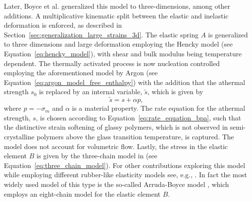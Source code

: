 Later, Boyce et al. \citep{boyceLargeInelasticDeformation1988} generalized this model to three-dimensions, among other additions.
A multiplicative kinematic split between the elastic and inelastic deformation is enforced, as described in Section~\ref{sec:generalization_large_strains_3d}.
The elastic spring $A$ is generalized to three dimensions and large deformation employing the Hencky model (see Equation~\eqref{eq:hencky_model}), with shear and bulk modulus being temperature dependent.
The thermally activated process is now nucleation controlled employing the aforementioned model by Argon \citep{argonTheoryLowtemperaturePlastic1973} (see Equation~\eqref{eq:argon_model_free_enthalpy}) with the addition that the athermal strength $s_0$ is replaced by an internal variable, $\tilde s$, which is given by
\begin{equation}
	\tilde{s}=s+\alpha p,
\end{equation}
where $p=-\sigma_m$ and $\alpha$ is a material property.
The rate equation for the athermal strength, $s$, is chosen according to Equation~\eqref{eq:rate_equation_bpa}, such that the distinctive strain softening of glassy polymers, which is not observed in semi-crystalline polymers above the glass transition temperature, is captured.
The model does not account for volumetric flow.
Lastly, the stress in the elastic element $B$ is given by the three-chain model in (see Equation~\eqref{eq:three_chain_model}).
For other contributions exploring this model while employing different rubber-like elasticity models see, e.g., \cite{arrudaEvolutionPlasticAnisotropy1993, arrudaEffectsStrainRate1995, wuImprovedNetworkModels1993, buckleyGlassrubberConstitutiveModel1995, sweeneyRateDependentNetwork1995}.
In fact the most widely used model of this type is the so-called Arruda-Boyce model \citep{arrudaEvolutionPlasticAnisotropy1993, arrudaEffectsStrainRate1995}, which employs an eight-chain model for the elastic element $B$.

